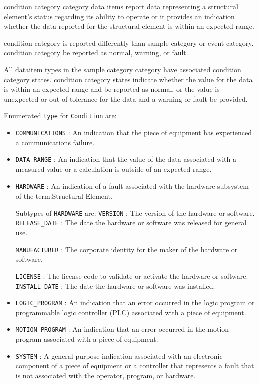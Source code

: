 \gls{condition category} category data items report data representing a \gls{structural element}’s status regarding its ability to operate or it provides an indication whether the data reported for the \gls{structural element} is within an expected range.

\gls{condition category} is reported differently than \gls{sample category} or \gls{event category}.  \gls{condition category} \must be reported as \gls{normal}, \gls{warning}, or \gls{fault}.

All \gls{dataitem} types in the \gls{sample category} category \may have associated \gls{condition category} states.  \gls{condition category} states indicate whether the value for the data is within an expected range and \must be reported as \gls{normal}, or the value is unexpected or out of tolerance for the data and a \gls{warning} or \gls{fault} \must be provided.


 Enumerated \texttt{type} for \texttt{Condition} are:
\begin{itemize}

\item \texttt{COMMUNICATIONS} : An indication that the piece of equipment has experienced a communications failure. 

\item \texttt{DATA_RANGE} : An indication that the value of the data associated with a measured value or a calculation is outside of an expected range. 

\item \texttt{HARDWARE} : An indication of a fault associated with the hardware subsystem of the {term:Structural Element}. 

Subtypes of \texttt{HARDWARE} are: 
\newline\tab \texttt{VERSION} : The version of the hardware or software. 
\newline\tab \texttt{RELEASE_DATE} : The date the hardware or software was released for general use.
 
\newline\tab \texttt{MANUFACTURER} : The corporate identity for the maker of the hardware or software.
 
\newline\tab \texttt{LICENSE} : The license code to validate or activate the hardware or software. 
\newline\tab \texttt{INSTALL_DATE} : The date the hardware or software was installed. 
\item \texttt{LOGIC_PROGRAM} : An indication that an error occurred in the logic program or programmable logic controller (PLC) associated with a piece of equipment. 

\item \texttt{MOTION_PROGRAM} : An indication that an error occurred in the motion program associated with a piece of equipment. 

\item \texttt{SYSTEM} : A general purpose indication associated with an electronic component of a piece of equipment or a controller that represents a fault that is not associated with the operator, program, or hardware. 

\end{itemize}

